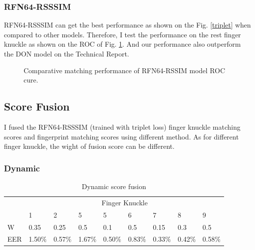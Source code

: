 \subsubsection{RFN64-RSSSIM}
RFN64-RSSSIM can get the best performance as shown on the Fig. \ref{triplet} when compared to other models. Therefore, I test the performance on the rest finger knuckle as shown on the ROC of Fig. \ref{rfn64-rssim}. And our performance also outperform the DON model on the Technical Report.
\begin{figure}[h]
    \centering
    \caption{Comparative matching performance of RFN64-RSSIM model ROC cure.}
    \label{rfn64-rssim}
\end{figure}


\subsection{Score Fusion}
I fused the RFN64-RSSSIM (trained with triplet loss) finger knuckle matching scores and fingerprint matching scores using different method. As for different finger knuckle, the wight of fusion score can be different.
\subsubsection{Dynamic}

\begin{table}[h]
    \centering
    \caption{Dynamic score fusion}
    \begin{tabular}{lllllllll}
    \hline
        & \multicolumn{8}{c}{Finger Knuckle}                                    \\
        & 1      & 2      & 5      & 5      & 6      & 7      & 8      & 9      \\ \hline
    W   & 0.35   & 0.25   & 0.5    & 0.1    & 0.5    & 0.15   & 0.3    & 0.5    \\
    EER & 1.50\% & 0.57\% & 1.67\% & 0.50\% & 0.83\% & 0.33\% & 0.42\% & 0.58\% \\ \hline
    \end{tabular}
\end{table}

